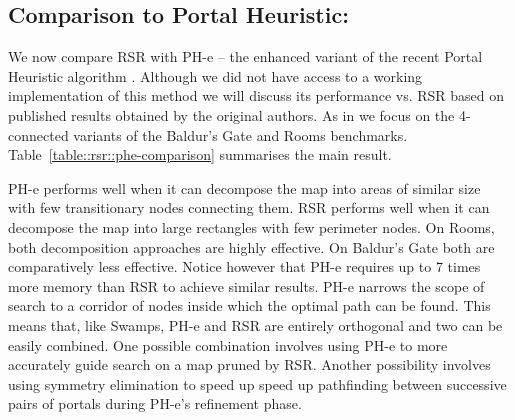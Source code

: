 \subsection{Comparison to Portal Heuristic:}
We now compare RSR with PH-e -- the enhanced variant of the recent 
Portal Heuristic algorithm \citep{goldenberg10}.
Although we did not have access to a working implementation of this method we
will discuss its performance vs. RSR based on published results obtained by the
original authors. As in \citep{goldenberg10} we focus on the 4-connected variants 
of the Baldur's Gate and Rooms benchmarks.
Table~\ref{table::rsr::phe-comparison} summarises the main result.
\par
PH-e performs well when it can decompose the map into areas of similar size with
few transitionary nodes connecting them.
RSR performs well when it can decompose the map into large rectangles with few
perimeter nodes.
On Rooms, both decomposition approaches are highly effective. 
On Baldur's Gate both are comparatively less effective.
Notice however that PH-e requires up to 7 times more memory than RSR to achieve
similar results.
PH-e narrows the scope of search to a corridor of nodes inside which the
optimal path can be found. This means that, like Swamps, PH-e and RSR
are entirely orthogonal and two can be easily combined. 
One possible combination involves using PH-e to more accurately guide search
on a map pruned by RSR. Another possibility involves using symmetry
elimination to speed up speed up pathfinding between successive pairs of
portals during PH-e's refinement phase.
